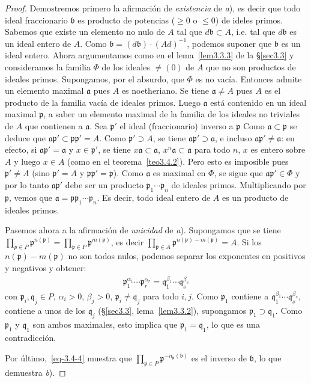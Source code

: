\documentclass[10pt,oneside,bibtotoc,smallheadings,leqno,a5paper,DIV=12]{scrbook}
\newcommand{\idl}[1]{\mathfrak{#1}}
\numberwithin{equation}{section}
\theoremstyle{defi}
\theoremstyle{enonce}
\theoremstyle{rem}
\numberwithin{theorem}{section}
\numberwithin{proposition}{section}
\numberwithin{definition}{section}
\numberwithin{lemma}{section}
\numberwithin{corollary}{section}
\numberwithin{example}{section}
\numberwithin{footnote}{section}%
\begin{document}
\begin{proof}
Demostremos primero la afirmaci\'on de {\em existencia} de {\itshape a}), es decir que todo ideal fraccionario
$\idl{b}$ es producto de potencias ($\geq 0$ o $\leq 0$) de ideles primos. Sabemos que existe un
elemento no nulo de $A$ tal que $d\idl{b}\subset A$, i.e. tal que $d\idl{b}$ es un ideal entero de $A$.
Como $\idl{b} = (d\idl{b})\cdot(Ad)^{-1}$, podemos suponer que $\idl{b}$ es un ideal entero. Ahora
argumentamos como en el lema~\ref{lem3.3.3} de la \S\ref{sec3.3} y consideramos la familia $\Phi$ de los ideales $\neq(0)$ de
$A$ que no son productos de ideales primos. Supongamos, por el absurdo, que $\Phi$ es no vac\'ia. Entonces
admite un elemento maximal $\idl{a}$ pues $A$ es noetheriano. Se tiene $\idl{a}\neq A$ pues $A$ es el
producto de la familia vac\'ia de ideales primos. Luego $\idl{a}$ est\'a contenido en un ideal maximal
$\idl{p}$, a saber un elemento maximal de la familia de los ideales no triviales de $A$ que contienen
a $\idl{a}$. Sea $\idl{p}'$ el ideal (fraccionario) inverso a $\idl{p}$ Como $\idl{a}\subset\idl{p}$ se deduce que
$\idl{a}\idl{p}'\subset\idl{p}\idl{p}' = A$. Como $\idl{p}'\supset A$, se tiene $\idl{a}\idl{p}'\supset\idl{a}$,
e incluso $\idl{a}\idl{p}'\neq\idl{a}$: en efecto, si $\idl{a}\idl{p}' = \idl{a}$ y $x\in\idl{p}'$, se tiene
$x\idl{a}\subset\idl{a}$, $x^{n}\idl{a}\subset\idl{a}$ para todo $n$, $x$ es entero sobre $A$ y luego $x\in A$
(como en el teorema~\ref{teo3.4.2}). Pero esto es imposible pues $\idl{p}'\neq A$ (sino $\idl{p}' = A$ y $\idl{p}\idl{p}'=\idl{p}$).
Como $\idl{a}$ es maximal en $\Phi$, se sigue que $\idl{a}\idl{p}'\in\Phi$ y por lo tanto $\idl{a}\idl{p}'$ debe
ser un producto $\idl{p}_{1}\cdots\idl{p}_{n}$ de ideales primos. Multiplicando por $\idl{p}$, vemos que
$\idl{a} = \idl{p}\idl{p}_{1}\cdots\idl{p}_{n}$. Es decir, todo ideal entero de $A$ es un producto de ideales primos.

Pasemos ahora a la afirmaci\'on de {\em unicidad} de {\itshape a}). Supongamos que se tiene $\prod_{p\in P}\idl{p}^{n(\idl{p})}
=\prod_{\idl{p}\in P}\idl{p}^{m(\idl{p})}$, es decir $\prod_{\idl{p}\in A}\idl{p}^{n(\idl{p})-m(\idl{p})}=A$.
Si los $n(\idl{p})-m(\idl{p})$ no son todos nulos, podemos separar los exponentes en positivos y negativos y
obtener:
\begin{gather}
\idl{p}_{1}^{\alpha_{1}}\cdots\idl{p}_{r}^{\alpha_{r}} = \idl{q}_{1}^{\beta_{1}}\cdots\idl{q}_{s}^{\beta_{s}}
\end{gather}
con $\idl{p}_{i},\idl{q}_{j}\in P$, $\alpha_{i} > 0$, $\beta_{j} > 0$, $\idl{p}_{i}\neq\idl{q}_{j}$ para todo
$i, j$. Como $\idl{p}_{1}$ contiene a $\idl{q}_{1}^{\beta_{1}}\cdots\idl{q}_{s}^{\beta_{s}}$, contiene
a unos de los $\idl{q}_{j}$ (\S\ref{sec3.3}, lema~\ref{lem3.3.2}), supongamos $\idl{p}_{1}\supset\idl{q}_{1}$. Como
$\idl{p}_{1}$ y $\idl{q}_{1}$ son ambos maximales, esto implica que $\idl{p}_{1}=\idl{q}_{1}$, lo que
es una contradicci\'on.

Por \'ultimo,~\eqref{eq-3.4-4} muestra que $\prod_{\idl{p}\in P}\idl{p}^{-n_{\idl{p}}(\idl{b})}$ es el inverso
de $\idl{b}$, lo que demuestra {\itshape b}).
\end{proof}
\end{document}
